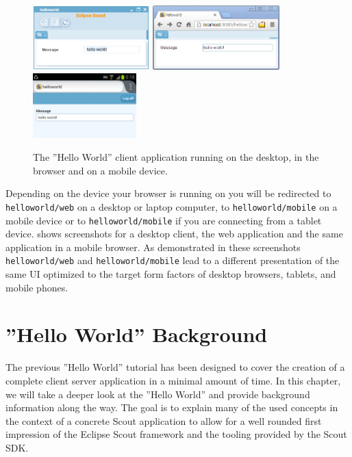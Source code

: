 \documentclass[a4paper,10pt,twoside]{book}
\begin{document}
\begin{figure}
\includegraphics[height=2.5cm]{helloworld_finished_rayo_swing.png}\hspace{5mm}
\includegraphics[height=2.5cm]{helloworld_finished_rayo_rap.png}\hspace{5mm}
\includegraphics[height=2.5cm]{helloworld_finished_rayo_rap_mobile.png}
\caption{The ''Hello World'' client application running on the desktop, in the browser and on a mobile device.}
\end{figure}

Depending on the device your browser is running on you will be redirected to \texttt{helloworld/web} on a desktop or laptop computer, to \texttt{helloworld/mobile} on a mobile device or to \texttt{helloworld/mobile} if you are connecting from a tablet device.
 shows screenshots for a desktop client, the web application and the same application in a mobile browser.
As demonstrated in these screenshots \texttt{helloworld/web} and \texttt{helloworld/mobile} lead to a different presentation of the same UI optimized to the target form factors of desktop browsers, tablets, and mobile phones.

\chapter{''Hello World'' Background}

The previous ''Hello World'' tutorial has been designed to cover the creation of a complete client server application in a minimal amount of time.
In this chapter, we will take a deeper look at the ''Hello World'' and provide background information along the way.
The goal is to explain many of the used concepts in the context of a concrete Scout application to allow for a well rounded first impression of the Eclipse Scout framework and the tooling provided by the Scout SDK.
\end{document}
